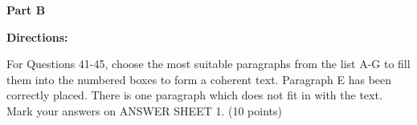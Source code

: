 
\textbf{Part B}

\textbf{Directions:}

For Questions 41-45, choose the most suitable paragraphs from the list A-G to fill them into the numbered boxes to form a coherent text. Paragraph E has been correctly placed. There is one paragraph which does not fit in with the text. Mark your answers on ANSWER SHEET 1. (10 points)

\vspace{6pt}